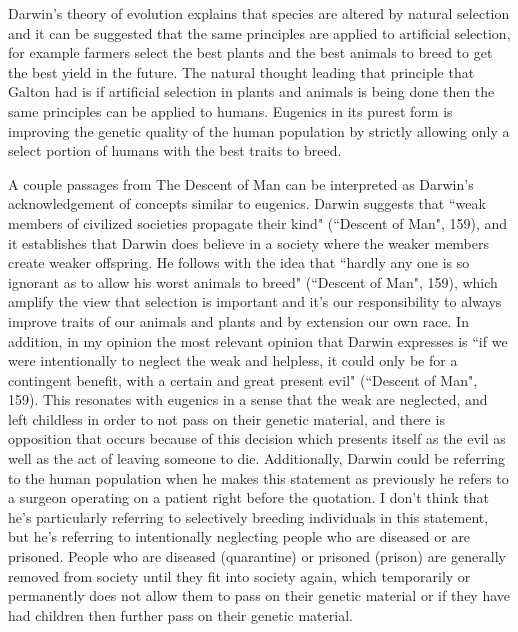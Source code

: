 \documentclass[11pt, oneside]{article}
\begin{document}
\par Darwin's theory of evolution explains that species are altered by natural selection and it can be suggested that the same principles are applied to artificial selection, for example farmers select the best plants and the best animals to breed to get the best yield in the future. The natural thought leading that principle that Galton had is if artificial selection in plants and animals is being done then the same principles can be applied to humans. Eugenics in its purest form is improving the genetic quality of the human population by strictly allowing only a select portion of humans with the best traits to breed. 

\par A couple passages from The Descent of Man can be interpreted as Darwin's acknowledgement of concepts similar to eugenics. Darwin suggests that ``weak members of civilized societies propagate their kind" (``Descent of Man", 159), and it establishes that Darwin does believe in a society where the weaker members create weaker offspring. He follows with the idea that ``hardly any one is so ignorant as to allow his worst animals to breed" (``Descent of Man", 159), which amplify the view that selection is important and it's our responsibility to always improve traits of our animals and plants and by extension our own race. In addition, in my opinion the most relevant opinion that Darwin expresses is  ``if we were intentionally to neglect the weak and helpless, it could only be for a contingent benefit, with a certain and great present evil" (``Descent of Man", 159). This resonates with eugenics in a sense that the weak are neglected, and left childless in order to not pass on their genetic material, and there is opposition that occurs because of this decision which presents itself as the evil as well as the act of leaving someone to die. Additionally, Darwin could be referring to the human population when he makes this statement as previously he refers to a surgeon operating on a patient right before the quotation. I don't think that he's particularly referring to selectively breeding individuals in this statement, but he's referring to intentionally neglecting people who are diseased or are prisoned. People who are diseased (quarantine) or prisoned (prison) are generally removed from society until they fit into society again, which temporarily or permanently does not allow them to pass on their genetic material or if they have had children then further pass on their genetic material. 
\end{document}
